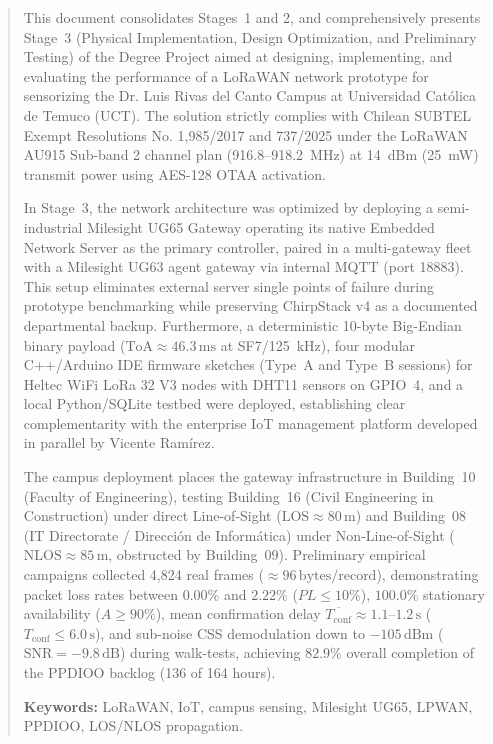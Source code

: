 \documentclass[12pt,oneside,openany,spanish,oldfontcommands]{memoir}
\begin{document}
\clearpage
\thispagestyle{empty}

\renewcommand{\abstractname}{Abstract}

\begin{abstract}
\setlength{\parskip}{3pt}

This document consolidates Stages~1 and 2, and comprehensively presents Stage~3 (Physical Implementation, Design Optimization, and Preliminary Testing) of the Degree Project aimed at designing, implementing, and evaluating the performance of a LoRaWAN network prototype for sensorizing the Dr. Luis Rivas del Canto Campus at Universidad Católica de Temuco (UCT). The solution strictly complies with Chilean SUBTEL Exempt Resolutions No. 1,985/2017 and 737/2025 under the LoRaWAN AU915 Sub-band 2 channel plan (916.8--918.2~MHz) at 14~dBm (25~mW) transmit power using AES-128 OTAA activation.

In Stage~3, the network architecture was optimized by deploying a semi-industrial Milesight UG65 Gateway operating its native Embedded Network Server as the primary controller, paired in a multi-gateway fleet with a Milesight UG63 agent gateway via internal MQTT (port 18883). This setup eliminates external server single points of failure during prototype benchmarking while preserving ChirpStack v4 as a documented departmental backup. Furthermore, a deterministic 10-byte Big-Endian binary payload ($\text{ToA} \approx 46.3\,\text{ms}$ at SF7/125~kHz), four modular C++/Arduino IDE firmware sketches (Type~A and Type~B sessions) for Heltec WiFi LoRa 32 V3 nodes with DHT11 sensors on GPIO~4, and a local Python/SQLite testbed were deployed, establishing clear complementarity with the enterprise IoT management platform developed in parallel by Vicente Ramírez.

The campus deployment places the gateway infrastructure in Building~10 (Faculty of Engineering), testing Building~16 (Civil Engineering in Construction) under direct Line-of-Sight ($\text{LOS} \approx 80\,\text{m}$) and Building~08 (IT Directorate / Dirección de Informática) under Non-Line-of-Sight ($\text{NLOS} \approx 85\,\text{m}$, obstructed by Building~09). Preliminary empirical campaigns collected 4,824 real frames ($\approx 96\,\text{bytes/record}$), demonstrating packet loss rates between $0.00\%$ and $2.22\%$ ($PL \le 10\%$), $100.0\%$ stationary availability ($A \ge 90\%$), mean confirmation delay $\overline{T_{\mathrm{conf}}} \approx 1.1\text{--}1.2\,\text{s}$ ($T_{\mathrm{conf}} \le 6.0\,\text{s}$), and sub-noise CSS demodulation down to $-105\,\text{dBm}$ ($\text{SNR} = -9.8\,\text{dB}$) during walk-tests, achieving $82.9\%$ overall completion of the PPDIOO backlog (136 of 164 hours).

\vspace{0.3cm}
\noindent\textbf{Keywords:} LoRaWAN, IoT, campus sensing, Milesight UG65, LPWAN, PPDIOO, LOS/NLOS propagation.
\end{abstract}
\end{document}
